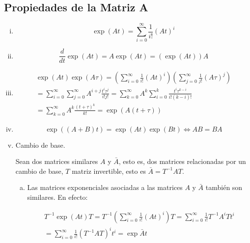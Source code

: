 \documentclass[12pt]{article}
\numberwithin{equation}{subsection}
\begin{document}
\subsection{Propiedades de la Matriz A}
\begin{enumerate}[i)]
\item 
\begin{equation}
\exp{(A t)} = \sum\limits_{i=0}^{\infty} \frac{1}{i!} (A t)^i
\end{equation}

\item
\begin{equation}
\frac{d}{dt} \exp{(A t)} = A \exp{(A t)} = (\exp{(A t)}) A
\end{equation}

\item

\begin{multline}
\exp{(At)} \exp{(A \tau)} = \left( \sum\limits_{i=0}^{\infty} \frac{1}{i!} (A t)^i \right) \left( \sum\limits_{j=0}^{\infty} \frac{1}{j!} (A \tau)^j \right) \\
= \sum\limits_{i=0}^{\infty} \sum\limits_{j=0}^{\infty} A^{i+j} \frac{t^i \tau^j}{i! j!} = \sum\limits_{k=0}^{\infty} A^k \sum\limits_{i=0}^{k} \frac{t^i \tau^{k-i}}{i! (k-i)!} \\
= \sum\limits_{k=0}^{\infty} A^k \frac{(t + \tau)^k}{k!} = \exp{(A(t + \tau))}
\end{multline}

\item
\begin{equation}
\exp{((A + B) t)} = \exp{(A t)} \exp{(B t)} \iff A B = B A
\end{equation}

\item Cambio de base.

Sean dos matrices similares $A$ y $\bar{A}$, esto es, dos matrices relacionadas por un cambio de base, $T$ matriz invertible, esto es $\bar{A} = T^{-1} A T$.

\begin{enumerate}[a)]
\item Las matrices exponenciales asociadas a las matrices $A$ y $\bar{A}$ también son similares. En efecto:

\begin{multline}
T^{-1} \exp{(At)} T = T^{-1} \left( \sum\limits_{i=0}^{\infty} \frac{1}{i!} (A t)^i \right) T = \sum\limits_{i=0}^{\infty} \frac{1}{i!} T^{-1} A^i T t^i \\
= \sum\limits_{i=0}^{\infty} \frac{1}{i!} (T^{-1} A T)^i t^i = \exp{\bar{A} t} \nonumber 
\end{multline}


\end{enumerate}
\end{enumerate}
\end{document}
